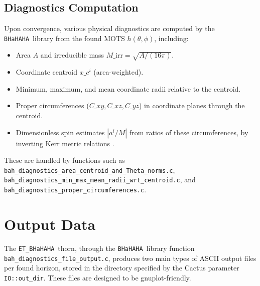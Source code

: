 \documentclass[a4paper,11pt]{article}
\newcommand{\thorn}[1]{{\tt #1}}
\newcommand{\BHaHAHA}{\thorn{ET\_BHaHAHA}} %
\newcommand{\bhahlib}{\texttt{BHaHAHA}} %
\begin{document}
\subsection{Diagnostics Computation}
Upon convergence, various physical diagnostics are computed by the \bhahlib\ library from the found MOTS $h(\theta, \phi)$, including:
\begin{itemize}
    \item Area $A$ and irreducible mass $M\_{\text{irr}} = \sqrt{A / (16\pi)}$.
    \item Coordinate centroid $x\_c^i$ (area-weighted).
    \item Minimum, maximum, and mean coordinate radii relative to the centroid.
    \item Proper circumferences ($C\_{xy}, C\_{xz}, C\_{yz}$) in coordinate planes through the centroid.
    \item Dimensionless spin estimates $|a^i/M|$ from ratios of these circumferences, by inverting Kerr metric relations \cite{Alcubierre2005}.
\end{itemize}
These are handled by functions such as \texttt{bah\_diagnostics\_area\_centroid\_and\_Theta\_norms.c}, \texttt{bah\_diagnostics\_min\_max\_mean\_radii\_wrt\_centroid.c}, and \texttt{bah\_diagnostics\_proper\_circumferences.c}.

\section{Output Data}
\label{sec:output}
The \BHaHAHA\ thorn, through the \bhahlib\ library function \texttt{bah\_diagnostics\_file\_output.c}, produces two main types of ASCII output files per found horizon, stored in the directory specified by the Cactus parameter \texttt{IO::out\_dir}. These files are designed to be gnuplot-friendly.
\end{document}
